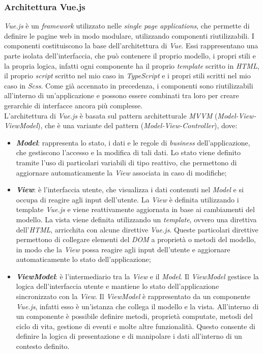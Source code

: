 \subsubsection{Architettura Vue.js}\label{subsubsec:architettura-vue-js}
\textit{Vue.js} è un \textit{framework} utilizzato nelle \textit{single page applications}, che permette di definire le pagine web in modo modulare, utilizzando componenti riutilizzabili.
I componenti costituiscono la base dell'architettura di \textit{Vue}. Essi rappresentano una parte isolata dell'interfaccia, che può contenere il proprio modello, i propri stili e la propria logica, infatti ogni componente ha il proprio
\textit{template} scritto in \textit{HTML}, il proprio \textit{script} scritto nel mio caso in \textit{TypeScript} e i propri stili scritti nel mio caso in \textit{Scss}.
Come già accennato in precedenza, i componenti sono riutilizzabili all'interno di un'applicazione e possono essere combinati tra loro per creare gerarchie di interfacce ancora più complesse.\\

L'architettura di \textit{Vue.js} è basata sul pattern architetturale \textit{MVVM} (\textit{Model-View-ViewModel}), che è una variante del pattern  (\textit{Model-View-Controller}), dove:
\begin{itemize}
  \item \textbf{\textit{Model}}: rappresenta lo stato, i dati e le regole di \textit{business} dell'applicazione, che gestiscono l'accesso e la modifica di tali dati. Lo stato viene definito tramite l'uso
  di particolari variabili di tipo reattivo, che permettono di aggiornare automaticamente la \textit{View} associata in caso di modifiche;
  \item \textbf{\textit{View}}: è l'interfaccia utente, che visualizza i dati contenuti nel \textit{Model} e si occupa di reagire agli input dell'utente. La \textit{View} è definita utilizzando i template \textit{Vue.js} e viene reattivamente aggiornata in base ai cambiamenti del modello. La vista viene definita utilizzando un \textit{template}, ovvero una direttiva dell'\textit{HTML}, arricchita con alcune direttive \textit{Vue.js}. 
  Queste particolari direttive permettono di collegare elementi del \textit{DOM} a proprietà o metodi del modello, in modo che la \textit{View} possa reagire agli input dell'utente e aggiornare automaticamente lo stato dell'applicazione;
  \item \textbf{\textit{ViewModel}}: è l'intermediario tra la \textit{View} e il \textit{Model}. Il \textit{ViewModel} gestisce la logica dell'interfaccia utente e mantiene lo stato dell'applicazione sincronizzato con la \textit{View}.
  Il \textit{ViewModel} è rappresentato da un componente \textit{Vue.js}, infatti esso è un'istanza che collega il modello e la vista. All'interno di un componente è possibile definire metodi, proprietà 
  computate, metodi del ciclo di vita, gestione di eventi e molte altre funzionalità. Questo consente di definire la logica di presentazione e di manipolare i dati all'interno di un contesto definito.
\end{itemize}

